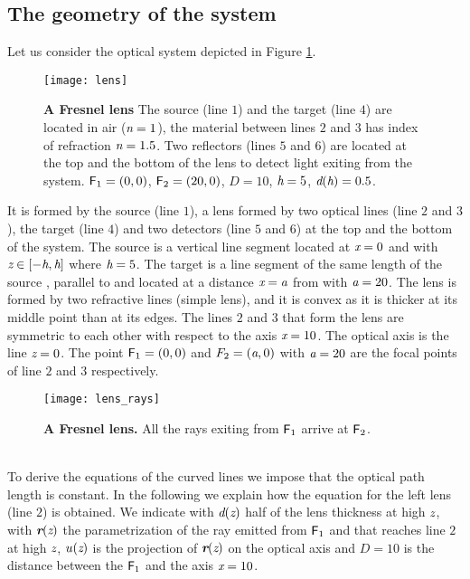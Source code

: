 \subsection{The geometry of the system}
Let us consider the optical system depicted in Figure \ref{fig:lens}. 
\begin{figure}[t]
  \begin{center}
  \texttt{[image: lens]}
  \end{center}
  \caption{\textbf{A Fresnel lens}
The source (line $1$) and the target (line $4$) are located in air ($\textit{n} = 1$), the material between lines $2$ and $3$ has index of refraction $\textit{n}=1.5$. 
Two reflectors (lines $5$ and $6$) are located at the top and the bottom of the lens to detect light exiting from the system. $\textsf{F}_1 = (0,0)$, $\textsf{F}_2 = (20,0)$, $D=10$, $\textit{h}=5$, $\textit{d}(\textit{h})=0.5$.}
\label{fig:lens}
 \end{figure}
It is formed by the source (line $1$), a lens formed by two optical lines (line $2$ and $3$), the target (line $4$) and two detectors (line $5$ and $6$) at the top and the bottom of the system. The source  is a vertical line segment located at $\textit{x}=0$ and with 
$\textit{z}\in[-\textit{h}, \textit{h}]$ where $\textit{h}=5$. The target  is a line segment of the same length of the source , parallel to  and located at a distance $\textit{x}=\textit{a}$ from  with $\textit{a} = 20$. The lens is formed by two refractive lines (simple lens), and it is convex as it is thicker at its middle point than at its edges.
The lines $2$ and $3$ that form the lens are symmetric to each other with respect to the axis $\textit{x}=10$. The optical axis is the line $\textit{z}=0$. The point $\textsf{F}_1 = (0,0)$ and $F_2 = (\textit{a}, 0)$ with $\textit{a} = 20$ are the focal points of line $2$ and $3$ respectively.
\begin{figure}[t]
  \begin{center}
  \texttt{[image: lens\_rays]}
  \end{center}
  \caption{\textbf{A Fresnel lens.} 
All the rays exiting from $\textsf{F}_1$ arrive at $\textsf{F}_2$.}
\label{fig:real-lens}
 \end{figure}
\\ \indent To derive the equations of the curved lines we impose that the optical path length is constant. In the following we explain how the equation for the left lens (line $2$) is obtained. We indicate with $\textit{d}(\textit{z})$ half of the lens thickness at high $\textit{z}$, with $\textit{\textbf{r}}(\textit{z})$ the parametrization of the ray emitted from $\textsf{F}_1$ and that reaches line $2$ at high $\textit{z}$, $u(\textit{z})$ is the projection of $\textit{\textbf{r}}(\textit{z})$ on the optical axis and $D=10$ is the distance between the $\textsf{F}_1$ and the axis $\textit{x}=10$.
